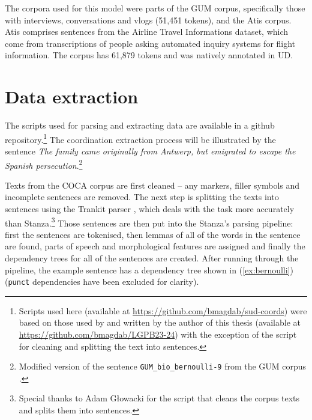 The corpora used for this model were parts of the GUM corpus, specifically those with interviews, conversations and vlogs (51,451 tokens), and the Atis corpus. Atis comprises sentences from the Airline Travel Informations dataset, which come from transcriptions of people asking automated inquiry systems for flight information. The corpus has 61,879 tokens and was natively annotated in UD. 

\section{Data extraction}

The scripts used for parsing and extracting data are available in a github repository.\footnote{Scripts used here (available at \url{https://github.com/bmagdab/sud-coords}) were based on those used by \cite{prz:etal:24} and written by the author of this thesis (available at \url{https://github.com/bmagdab/LGPB23-24}) with the exception of the script for cleaning and splitting the text into sentences.} The coordination extraction process will be illustrated by the sentence \textsl{The family came originally from Antwerp, but emigrated to escape the Spanish persecution}.\footnote{Modified version of the sentence \texttt{GUM\_bio\_bernoulli-9} from the GUM corpus \citep{Zeldes2017}.} 

Texts from the COCA corpus are first cleaned -- any markers, filler symbols and incomplete sentences are removed. The next step is splitting the texts into sentences using the Trankit parser \citep{nguyen2021trankit}, which deals with the task more accurately than Stanza.\footnote{Special thanks to Adam Głowacki for the script that cleans the corpus texts and splits them into sentences.} Those sentences are then put into the Stanza's parsing pipeline: first the sentences are tokenised, then lemmas of all of the words in the sentence are found, parts of speech and morphological features are assigned and finally the dependency trees for all of the sentences are created. After running through the pipeline, the example sentence has a dependency tree shown in (\ref{ex:bernoulli}) (\texttt{punct} dependencies have been excluded for clarity). 

